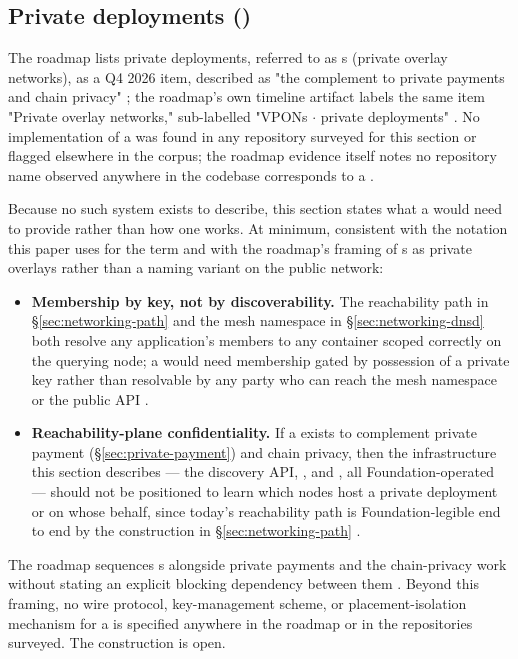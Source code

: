 \subsection{Private deployments (\VPON)}
\label{sec:networking-vpon}

The roadmap lists private deployments, referred to as \VPON s (private overlay networks), as a
Q4 2026 item, described as "the complement to private payments and chain privacy"
; the roadmap's own timeline artifact labels the
same item "Private overlay networks," sub-labelled "VPONs $\cdot$ private deployments"
. No implementation of a \VPON was found in any
repository surveyed for this section or flagged elsewhere in the corpus; the roadmap evidence
itself notes no repository name observed anywhere in the codebase corresponds to a \VPON
{}. \planned

Because no such system exists to describe, this section states what a \VPON would need to provide
rather than how one works. At minimum, consistent with the notation this paper uses for the term
and with the roadmap's framing of \VPON s as private overlays rather than a naming variant on the
public network:
\begin{itemize}
  \item \textbf{Membership by key, not by discoverability.} The reachability path in
  \S\ref{sec:networking-path} and the mesh namespace in \S\ref{sec:networking-dnsd} both resolve
  any application's members to any container scoped correctly on the querying node; a \VPON would
  need membership gated by possession of a private key rather than resolvable by any party who can
  reach the mesh namespace or the public API \srcinferred.
  \item \textbf{Reachability-plane confidentiality.} If a \VPON exists to complement private
  payment (\S\ref{sec:private-payment}) and chain privacy, then the infrastructure this section
  describes — the discovery API, \FDM, and \PDNS, all Foundation-operated — should not be
  positioned to learn which nodes host a private deployment or on whose behalf, since today's
  reachability path is Foundation-legible end to end by the construction in
  \S\ref{sec:networking-path} \srcinferred.
\end{itemize}
The roadmap sequences \VPON s alongside private payments and the chain-privacy work without
stating an explicit blocking dependency between them
. Beyond this framing, no wire protocol,
key-management scheme, or placement-isolation mechanism for a \VPON is specified anywhere in the
roadmap or in the repositories surveyed. The construction is open.

